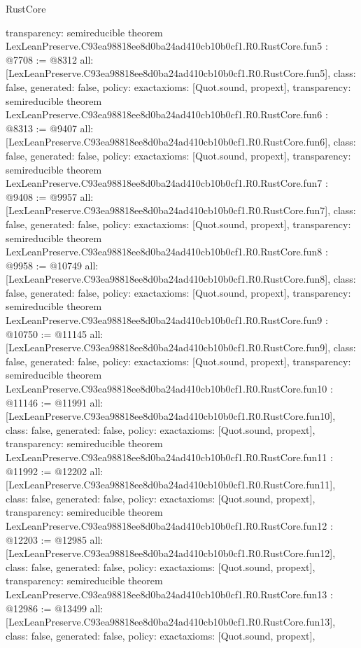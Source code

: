 \begin{lexlean}{RustCore}
\begin{coremodule}
{  transparency: semireducible
}
theorem LexLeanPreserve.C93ea98818ee8d0ba24ad410cb10b0cf1.R0.RustCore.fun5 : @7708 := @8312 {
  all: [LexLeanPreserve.C93ea98818ee8d0ba24ad410cb10b0cf1.R0.RustCore.fun5],
  class: false,
  generated: false,
  policy: exact{axioms: [Quot.sound, propext]},
  transparency: semireducible
}
theorem LexLeanPreserve.C93ea98818ee8d0ba24ad410cb10b0cf1.R0.RustCore.fun6 : @8313 := @9407 {
  all: [LexLeanPreserve.C93ea98818ee8d0ba24ad410cb10b0cf1.R0.RustCore.fun6],
  class: false,
  generated: false,
  policy: exact{axioms: [Quot.sound, propext]},
  transparency: semireducible
}
theorem LexLeanPreserve.C93ea98818ee8d0ba24ad410cb10b0cf1.R0.RustCore.fun7 : @9408 := @9957 {
  all: [LexLeanPreserve.C93ea98818ee8d0ba24ad410cb10b0cf1.R0.RustCore.fun7],
  class: false,
  generated: false,
  policy: exact{axioms: [Quot.sound, propext]},
  transparency: semireducible
}
theorem LexLeanPreserve.C93ea98818ee8d0ba24ad410cb10b0cf1.R0.RustCore.fun8 : @9958 := @10749 {
  all: [LexLeanPreserve.C93ea98818ee8d0ba24ad410cb10b0cf1.R0.RustCore.fun8],
  class: false,
  generated: false,
  policy: exact{axioms: [Quot.sound, propext]},
  transparency: semireducible
}
theorem LexLeanPreserve.C93ea98818ee8d0ba24ad410cb10b0cf1.R0.RustCore.fun9 : @10750 := @11145 {
  all: [LexLeanPreserve.C93ea98818ee8d0ba24ad410cb10b0cf1.R0.RustCore.fun9],
  class: false,
  generated: false,
  policy: exact{axioms: [Quot.sound, propext]},
  transparency: semireducible
}
theorem LexLeanPreserve.C93ea98818ee8d0ba24ad410cb10b0cf1.R0.RustCore.fun10 : @11146 := @11991 {
  all: [LexLeanPreserve.C93ea98818ee8d0ba24ad410cb10b0cf1.R0.RustCore.fun10],
  class: false,
  generated: false,
  policy: exact{axioms: [Quot.sound, propext]},
  transparency: semireducible
}
theorem LexLeanPreserve.C93ea98818ee8d0ba24ad410cb10b0cf1.R0.RustCore.fun11 : @11992 := @12202 {
  all: [LexLeanPreserve.C93ea98818ee8d0ba24ad410cb10b0cf1.R0.RustCore.fun11],
  class: false,
  generated: false,
  policy: exact{axioms: [Quot.sound, propext]},
  transparency: semireducible
}
theorem LexLeanPreserve.C93ea98818ee8d0ba24ad410cb10b0cf1.R0.RustCore.fun12 : @12203 := @12985 {
  all: [LexLeanPreserve.C93ea98818ee8d0ba24ad410cb10b0cf1.R0.RustCore.fun12],
  class: false,
  generated: false,
  policy: exact{axioms: [Quot.sound, propext]},
  transparency: semireducible
}
theorem LexLeanPreserve.C93ea98818ee8d0ba24ad410cb10b0cf1.R0.RustCore.fun13 : @12986 := @13499 {
  all: [LexLeanPreserve.C93ea98818ee8d0ba24ad410cb10b0cf1.R0.RustCore.fun13],
  class: false,
  generated: false,
  policy: exact{axioms: [Quot.sound, propext]},
}
\end{coremodule}
\end{lexlean}
